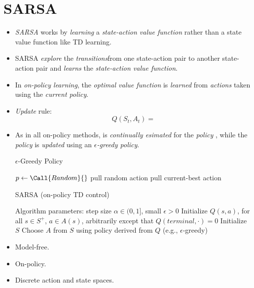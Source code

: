 \documentclass[
	number={11},
	title={Reinforcement Learning}
]{cs584notes}
\begin{document}
\section{SARSA}\label{sec:sarsa}
\begin{itemize}
	\item \emph{SARSA} works by \emph{learning} a \emph{state-action value function} rather than a state value function like TD learning.
	\item SARSA \emph{explore} the \emph{transitions}from one state-action pair to another state-action pair and \emph{learns} the \emph{state-action value function}.
	\item In \emph{on-policy learning}, the \emph{optimal value function} is \emph{learned} from \emph{actions} taken using the \emph{current policy}.
	\item \emph{Update} rule:
	\begin{equation}
		Q(S_{t}, A_{t}) =
		\label{eq:sarsa}
	\end{equation}
	\item As in all on-policy methods,  is \emph{continually esimated} for the \emph{policy} \data{$\pi$}, while the \emph{policy} \data{$\pi$} is \emph{updated} using an \emph{$\epsilon$-greedy policy}.
	\begin{algorithm}[H]
		\caption{$\epsilon$-Greedy Policy}\label{alg:}
		\begin{algorithmic}[1]
			\State $p \gets \Call{Random}{}$
				\State pull random action
			\Else
				\State pull current-best action
			\EndIf
		\end{algorithmic}
	\end{algorithm}
	\begin{algorithm}[H]
		\caption{SARSA (on-policy TD control)}\label{alg:sarsa}
		\begin{algorithmic}[1]
			\State Algorithm parameters: step size $\alpha \in (0, 1]$, small $\epsilon > 0$
			\State Initialize $Q(s,a)$, for all $s \in S^{+}$, $a \in A(s)$, arbitrarily except that $Q(terminal,\cdot) = 0$
				\State Initialize $S$
				\State Choose $A$ from $S$ using policy derived from $Q$ (e.g., $\epsilon$-greedy)
			\EndLoop
		\end{algorithmic}
	\end{algorithm}
	\item Model-free.
	\item On-policy.
	\item Discrete action and state spaces.
\end{itemize}
\end{document}
